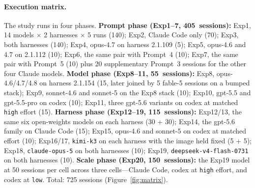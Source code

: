 \documentclass{article}
\begin{document}
\paragraph{Execution matrix.}
The study runs in four phases. \textbf{Prompt phase (Exp1--7,
405~sessions):} Exp1, 14 models $\times$ 2 harnesses $\times$ 5
runs (140); Exp2, Claude Code only (70); Exp3, both harnesses
(140); Exp4, opus-4.7 on harness 2.1.109 (5); Exp5, opus-4.6 and
4.7 on 2.1.112 (10); Exp6, the same pair with Prompt~4 (10); Exp7,
the same pair with Prompt~5 (10) plus 20 supplementary Prompt~3
sessions for the other four Claude models.
\textbf{Model phase (Exp8--11, 55~sessions):} Exp8, opus-4.6/4.7/4.8
on harness 2.1.154 (15, later joined by 5 fable-5 sessions on a
bumped stack); Exp9, sonnet-4.6 and sonnet-5 on the Exp8 stack
(10); Exp10, gpt-5.5 and gpt-5.5-pro on codex (10); Exp11, three
gpt-5.6 variants on codex at matched \texttt{high} effort (15).
\textbf{Harness phase (Exp12--19, 115~sessions):} Exp12/13, the
same six open-weights models on each harness (30 + 30); Exp14,
the gpt-5.6 family on Claude Code (15); Exp15, opus-4.6 and
sonnet-5 on codex at matched effort (10); Exp16/17,
\texttt{kimi-k3} on each harness with the image held fixed (5 + 5);
Exp18, \texttt{claude-opus-5} on both harnesses (10); Exp19,
\texttt{deepseek-v4-flash-0731} on both harnesses (10).
\textbf{Scale phase (Exp20, 150~sessions):} the Exp19 model at 50
sessions per cell across three cells---Claude Code, codex at
\texttt{high} effort, and codex at \texttt{low}. Total: 725
sessions (Figure~\ref{fig:matrix}).
\end{document}
